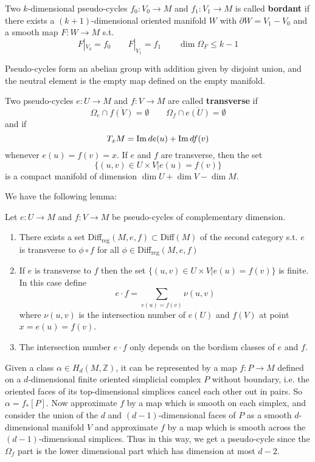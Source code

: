 \documentclass[twoside]{article}
\begin{document}
Two $k$-dimensional pseudo-cycles $f_0\colon V_0\rightarrow M$ and $f_1\colon V_1\rightarrow M$ is called \textbf{bordant} 
if there exists a $(k+1)$-dimensional oriented manifold $W$ with $\partial W=V_1-V_0$ 
and a smooth map $F\colon W\rightarrow M$ s.t. 
\[F|_{V_0}=f_0 \qquad F|_{V_1}=f_1 \qquad \dim \Omega_F\leq k-1\]

Pseudo-cycles form an abelian group with addition given by disjoint union, 
and the neutral element is the empty map defined on the empty manifold.

Two pseudo-cycles $e\colon U\rightarrow M$ and $f\colon V\rightarrow M$ are called \textbf{transverse} if
\[\Omega_e\cap \overline{f(V)}=\emptyset \qquad \Omega_f\cap\overline{e(U)}=\emptyset\]
and if
\[T_xM=\operatorname{Im} de(u)+\operatorname{Im} df(v)\]
whenever $e(u)=f(v)=x$. If $e$ and $f$ are transverse, then the set
\[\{(u,v)\in U\times V|e(u)=f(v)  \}\]
is a compact manifold of dimension $\dim U+\dim V-\dim M$.

We have the following lemma:

\begin{lemma}
Let $e\colon U\rightarrow M$ and $f\colon V\rightarrow M$ be pseudo-cycles of complementary dimension.
    \begin{enumerate}
        \item There exists a set Diff$_{\textrm{reg}}(M,e,f)\subset$Diff$(M)$ of the second category 
        s.t. $e$ is transverse to $\phi\circ f$ for all $\phi\in$Diff$_{\textrm{reg}}(M,e,f)$
        \item If $e$ is transverse to $f$ then the set $\{(u,v)\in U\times V|e(u)=f(v)  \}$ is finite. 
        In this case define
        \[e\cdot f=\sum_{e(u)=f(v)}\nu(u,v)\]
        where $\nu(u,v)$ is the intersection number of $e(U)$ and $f(V)$ at point $x=e(u)=f(v)$.
        \item The intersection number $e\cdot f$ only depends on the bordism classes of $e$ and $f$.
    \end{enumerate}
\end{lemma}

Given a class $\alpha\in H_d(M,\mathbb{Z})$, it can be represented by a map $f\colon P\rightarrow M$ 
defined on a $d$-dimensional finite oriented simplicial complex $P$ without boundary, 
i.e. the oriented faces of its top-dimensional simplices cancel each other out in pairs. 
So $\alpha=f_*[P]$. Now approximate $f$ by a map which is smooth on each simplex, 
and consider the union of the $d$ and $(d-1)$-dimensional faces of $P$ 
as a smooth $d$-dimensional manifold $V$ and approximate $f$ by a map 
which is smooth across the $(d-1)$-dimensional simplices. Thus in this way, 
we get a pseudo-cycle since the $\Omega_f$ part is the lower dimensional part which has dimension at most $d-2$.
\end{document}
